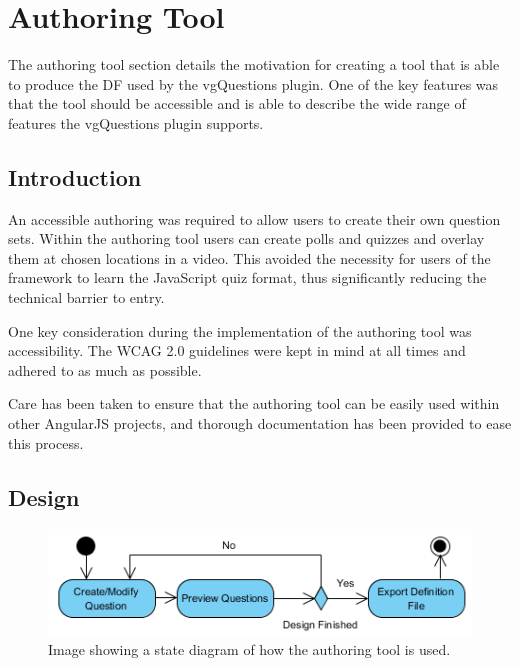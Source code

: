 \chapter{Authoring Tool} 
\label{Chapter:Authoring Tool}

\begin{preamble}
The authoring tool section details the motivation for creating a tool that is able to produce the \gls{DF} used by the \gls{vgQuestions} plugin. One of the key features was that the tool should be accessible and is able to describe the wide range of features the \gls{vgQuestions} plugin supports.
\end{preamble}

\section{Introduction}
\label{Section:Authoring_Introduction}

An accessible \gls{authoring} was required to allow users to create their own question sets. Within the authoring tool users can create polls and quizzes and overlay them at chosen locations in a video. This avoided the necessity for users of the framework to learn the JavaScript quiz format, thus significantly reducing the technical barrier to entry. 

One key consideration during the implementation of the authoring tool was accessibility. The \gls{WCAG} 2.0 guidelines were kept in mind at all times and adhered to as much as possible.

Care has been taken to ensure that the authoring tool can be easily used within other AngularJS projects, and thorough documentation has been provided to ease this process.

\section{Design} 
\label{Section:Authoring_Design}

\begin{figure}[h]
	\centering
		\includegraphics[width=\textwidth]{../figures/authoring_tool/state_diagram.png}

	\caption{
		\label{Figure:Authoring_Tool_state_diagram}
		Image showing a state diagram of how the authoring tool is used.
	}
\end{figure}

